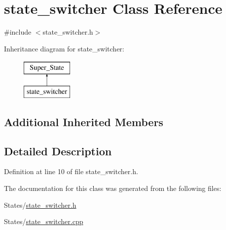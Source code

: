 \hypertarget{classstate__switcher}{}\section{state\+\_\+switcher Class Reference}
\label{classstate__switcher}


{\ttfamily \#include $<$state\+\_\+switcher.\+h$>$}

Inheritance diagram for state\+\_\+switcher\+:\begin{figure}[H]
\begin{center}
\leavevmode
\includegraphics[height=2.000000cm]{classstate__switcher}
\end{center}
\end{figure}
\subsection*{Additional Inherited Members}


\subsection{Detailed Description}


Definition at line 10 of file state\+\_\+switcher.\+h.



The documentation for this class was generated from the following files\+:\begin{DoxyCompactItemize}
\item 
States/\hyperlink{state__switcher_8h}{state\+\_\+switcher.\+h}\item 
States/\hyperlink{state__switcher_8cpp}{state\+\_\+switcher.\+cpp}\end{DoxyCompactItemize}
